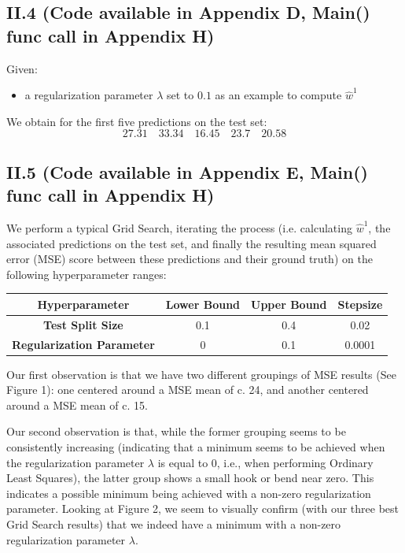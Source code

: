 \documentclass{homework}
\begin{document}
\subsection*{II.4 (Code available in Appendix D, Main() func call in Appendix H)} 

Given:
\begin{itemize}
    \item a regularization parameter $\lambda$ set to $0.1$ as an example to compute $\hat{w}^1$
\end{itemize}
We obtain for the first five predictions on the test set:
$$27.31\quad 33.34\quad 16.45\quad 23.7\quad 20.58$$

\subsection*{II.5 (Code available in Appendix E, Main() func call in Appendix H)} 

We perform a typical Grid Search, iterating the process (i.e. calculating $\hat{w}^1$, the associated predictions 
on the test set, and finally the resulting mean squared error (MSE) score between these predictions and their
ground truth) on the following hyperparameter ranges:

\begin{center}
\begin{tabular}{ | c | c | c | c | } 
\hline
\textbf{Hyperparameter} & \textbf{Lower Bound} & \textbf{Upper Bound} & \textbf{Stepsize} \\
\hline
\textbf{Test Split Size} & 0.1 & 0.4 & 0.02 \\
\hline
\textbf{Regularization Parameter} & 0 & 0.1 & 0.0001 \\
\hline
\end{tabular}
\end{center}

Our first observation is that we have two different groupings of MSE results (See Figure 1): one centered around
a MSE mean of c. 24, and another centered around a MSE mean of c. 15. 

Our second observation is that, while the former grouping seems to be consistently increasing (indicating that a
minimum seems to be achieved when the regularization parameter $\lambda$ is equal to $0$, i.e., when performing
Ordinary Least Squares), the latter group shows a small hook or bend near zero. This indicates a possible minimum 
being achieved with a non-zero regularization parameter. Looking at Figure 2, we seem to visually confirm (with our 
three best Grid Search results) that we indeed have a minimum with a non-zero regularization parameter $\lambda$. 
\end{document}
